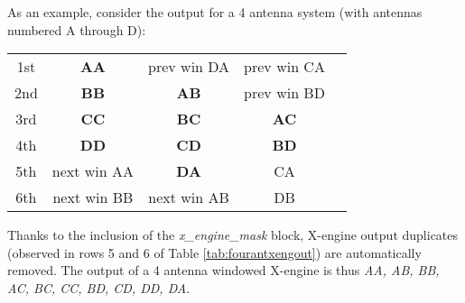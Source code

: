 {As an example, consider the output for a 4 antenna system (with antennas numbered A through D):

\begin{table*}[h]
\centering
\begin{tabular}{c c c c c}
1st & \textbf{AA} & prev win DA & prev win CA \\
2nd & \textbf{BB} & \textbf{AB} & prev win BD \\
3rd & \textbf{CC} & \textbf{BC} & \textbf{AC} \\
4th & \textbf{DD} & \textbf{CD	} & \textbf{BD} \\
5th & next win AA & \textbf{DA} & CA \\
6th & next win BB & next win AB & DB \\
\end{tabular}
\caption{Boldfaced type represents current valid window of data. Data is read out right to left, top to bottom. Non-boldfaced data is masked.}
\label{tab:fourantxengout}
\end{table*}

Thanks to the inclusion of the \textit{x\_engine\_mask} block, X-engine output duplicates (observed in rows 5 and 6 of Table \ref{tab:fourantxengout}) are automatically removed. The output of a 4 antenna windowed X-engine is thus \textit{AA, AB, BB, AC, BC, CC, BD, CD, DD, DA}.


}